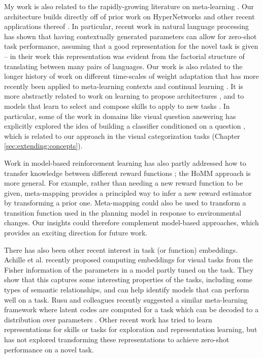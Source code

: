 My work is also related to the rapidly-growing literature on meta-learning \citep[e.g.][]{Vinyals2016, Santoro2016, Finn2017a, Finn2018, Stadie2018, Botvinick2019, Ravichandran2019}. Our architecture builds directly off of prior work on HyperNetworks \citep{Ha2016} and other recent applications thereof  \citep[e.g.][]{Brock2018a, Zhang2019, Li2019a, Rusu2019}. In particular, recent work in natural language processing has shown that having contextually generated parameters can allow for zero-shot task performance, assuming that a good representation for the novel task is given \citep{Platanios2017} -- in their work this representation was evident from the factorial structure of translating between many pairs of languages. Our work is also related to the longer history of work on different time-scales of weight adaptation \citep{Hinton1982, Kumaran2016} that has more recently been applied to meta-learning contexts \citep[e.g.][]{Ba2016, Munkhdalai2017, Garnelo2018} and continual learning \citep[e.g.]{Hu2019}. It is more abstractly related to work on learning to propose architectures \citep[e.g.][]{Zoph2016, Cao2019}, and to models that learn to select and compose skills to apply to new tasks \citep[e.g.][]{Andreas, Andreas2016, Tessler2016, Reed2015, Chang2019a}. In particular, some of the work in domains like visual question answering has explicitly explored the idea of building a classifier conditioned on a question \citep{Andreas, Andreasa}, which is related to our approach in the visual categorization tasks (Chapter \ref{sec:extending:concepts}).

Work in model-based reinforcement learning has also partly addressed how to transfer knowledge between different reward functions \citep[e.g.][]{Laroche2017}; the HoMM approach is more general. For example, rather than needing a new reward function to be given, meta-mapping provides a principled way to infer a new reward estimator by transforming a prior one. Meta-mapping could also be used to transform a transition function used in the planning model in response to environmental changes. Our insights could therefore complement model-based approaches, which provides an exciting direction for future work.

There has also been other recent interest in task (or function) embeddings. Achille et al. \citep{Achille2019} recently proposed computing embeddings for visual tasks from the Fisher information of the parameters in a model partly tuned on the task. They show that this captures some interesting properties of the tasks, including some types of semantic relationships, and can help identify models that can perform well on a task. Rusu and colleagues recently suggested a similar meta-learning framework where latent codes are computed for a task which can be decoded to a distribution over parameters \citep{Rusu2019}. Other recent work has tried to learn representations for skills \citep[e.g.][]{Eysenbach2019} or tasks \citep[e.g.]{Hsu2019} for exploration and representation learning, but has not explored transforming these representations to achieve zero-shot performance on a novel task.

